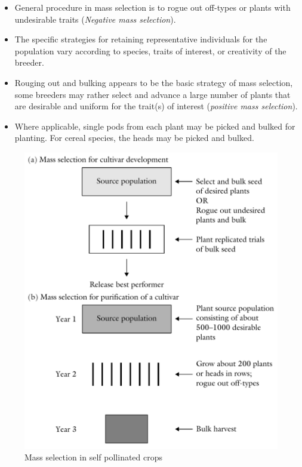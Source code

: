 \documentclass[11pt,ignorenonframetext,aspectratio=169]{beamer}
\providecommand{\tightlist}{%
  \setlength{\itemsep}{0pt}\setlength{\parskip}{0pt}}
\begin{document}
\begin{frame}{}
\protect\hypertarget{section-4}{}
\begin{itemize}
\tightlist
\item
  General procedure in mass selection is to rogue out off-types or
  plants with undesirable traits (\emph{Negative mass selection}).
\item
  The specific strategies for retaining representative individuals for
  the population vary according to species, traits of interest, or
  creativity of the breeder.
\item
  Rouging out and bulking appears to be the basic strategy of mass
  selection, some breeders may rather select and advance a large number
  of plants that are desirable and uniform for the trait(s) of interest
  (\emph{positive mass selection}).
\item
  Where applicable, single pods from each plant may be picked and bulked
  for planting. For cereal species, the heads may be picked and bulked.
\end{itemize}
\end{frame}

\begin{frame}{}
\protect\hypertarget{section-5}{}
\begin{figure}

{\centering \includegraphics[width=0.48\linewidth]{./images/mass_selection} 

}

\caption{Mass selection in self pollinated crops}\label{fig:mass-selection}
\end{figure}
\end{frame}
\end{document}
